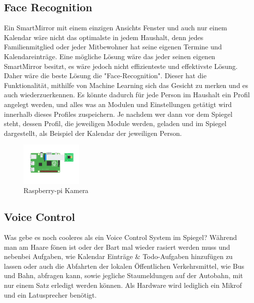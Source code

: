 \subsection{Face Recognition}
Ein SmartMirror mit einem einzigen Ansichts Fenster und auch nur einem Kalendar wäre nicht das optimalste in jedem Haushalt, denn jedes Familienmitglied oder jeder Mitbewohner hat seine eigenen Termine und Kalendareinträge. Eine mögliche Lösung wäre das jeder seinen eigenen SmartMirror besitzt, es wäre jedoch nicht effizienteste und effektivste Lösung. Daher wäre die beste Lösung die "Face-Recognition". Dieser hat die Funktionalität, mithilfe von Machine Learning sich das Gesicht zu merken und es auch wiederzuerkennen. Es könnte dadurch für jede Person im Haushalt ein Profil angelegt werden, und alles was an Modulen und Einstellungen getätigt wird innerhalb dieses Profiles zuspeichern. Je nachdem wer dann vor dem Spiegel steht, dessen Profil, die jeweiligen Module werden, geladen und im Spiegel dargestellt, als Beispiel der Kalendar der jeweiligen Person. 
\begin{figure}
\includegraphics[width=30mm]{pictures/raspberry-pi-camera-2.png}
\caption{Raspberry-pi Kamera}
\end{figure}
\subsection{Voice Control}
Was gebe es noch cooleres als ein Voice Control System im Spiegel? Während man am Haare fönen ist oder der Bart mal wieder rasiert werden muss und nebenbei Aufgaben, wie Kalendar Einträge \& Todo-Aufgaben hinzufügen zu lassen oder auch die Abfahrten der lokalen Öffentlichen Verkehrsmittel, wie Bus und Bahn,  abfragen kann, sowie jegliche Staumeldungen auf der Autobahn, mit nur einem Satz erledigt werden können. Als Hardware wird lediglich ein Mikrof und ein Latusprecher benötigt.

